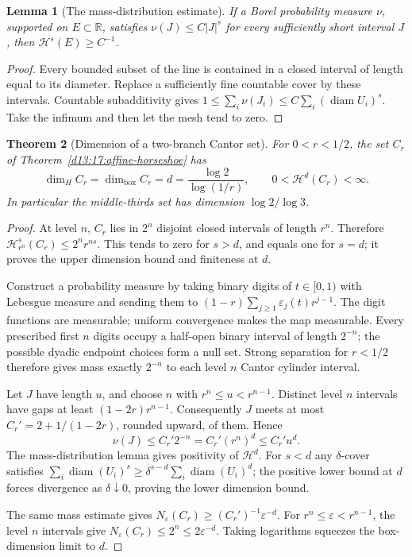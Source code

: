 \documentclass[11pt,oneside]{book}
\newtheorem{theorem}{Theorem}[chapter]
\newtheorem{lemma}[theorem]{Lemma}
\theoremstyle{definition}
\theoremstyle{remark}\newtheorem{remark}[theorem]{Remark}
\newcommand{\R}{\mathbb R}\newcommand{\C}{\mathbb C}
\newcommand{\abs}[1]{\lvert#1\rvert}\newcommand{\norm}[1]{\lVert#1\rVert}
\begin{document}
\begin{lemma}[The mass-distribution estimate]\label{d13:18:mass-distribution}
If a Borel probability measure \(\nu\), supported on \(E\subset\R\),
satisfies \(\nu(J)\leq C\abs{J}^s\) for every sufficiently short
interval \(J\), then \(\mathcal H^s(E)\geq C^{-1}\).
\end{lemma}
\begin{proof}
Every bounded subset of the line is contained in a closed interval
of length equal to its diameter. Replace a sufficiently fine
countable cover by these intervals. Countable subadditivity gives
\(1\leq\sum_i\nu(J_i)\leq C\sum_i(\operatorname{diam}U_i)^s\).
Take the infimum and then let the mesh tend to zero.
\end{proof}

\begin{theorem}[Dimension of a two-branch Cantor set]\label{d13:18:cantor-dimension}
For \(0<r<1/2\), the set \(C_r\) of
Theorem~\ref{d13:17:affine-horseshoe} has
\[
 \dim_H C_r=\dim_{\mathrm{box}}C_r
       =d=\frac{\log2}{\log(1/r)},\qquad
          0<\mathcal H^d(C_r)<\infty .
\]
In particular the middle-thirds set has dimension \(\log2/\log3\).
\end{theorem}
\begin{proof}
At level \(n\), \(C_r\) lies in \(2^n\) disjoint closed intervals
of length \(r^n\). Therefore
\(\mathcal H^s_{r^n}(C_r)\leq 2^nr^{ns}\).
This tends to zero for \(s>d\), and equals one for \(s=d\);
it proves the upper dimension bound and finiteness at \(d\).

Construct a probability measure by taking binary digits of
\(t\in[0,1)\) with Lebesgue measure and sending them to
\((1-r)\sum_{j\geq1}\varepsilon_j(t)r^{j-1}\).
The digit functions are measurable; uniform convergence makes the
map measurable. Every prescribed first \(n\) digits occupy a
half-open binary interval of length \(2^{-n}\); the possible
dyadic endpoint choices form a null set. Strong separation for
\(r<1/2\) therefore gives mass exactly \(2^{-n}\) to each level
\(n\) Cantor cylinder interval.

Let \(J\) have length \(u\), and choose \(n\) with
\(r^n\leq u<r^{n-1}\). Distinct level \(n\) intervals have gaps
at least \((1-2r)r^{n-1}\). Consequently \(J\) meets at most
\(C_r'=2+1/(1-2r)\), rounded upward, of them. Hence
\[
 \nu(J)\leq C_r'2^{-n}=C_r'(r^n)^d\leq C_r'u^d .
\]
The mass-distribution lemma gives positivity of \(\mathcal H^d\).
For \(s<d\) any \(\delta\)-cover satisfies
\(\sum_i\operatorname{diam}(U_i)^s
\geq \delta^{s-d}\sum_i\operatorname{diam}(U_i)^d\);
the positive lower bound at \(d\) forces divergence as
\(\delta\downarrow0\), proving the lower dimension bound.

The same mass estimate gives
\(N_\varepsilon(C_r)\geq (C_r')^{-1}\varepsilon^{-d}\).
For \(r^n\leq\varepsilon<r^{n-1}\), the level \(n\) intervals
give \(N_\varepsilon(C_r)\leq2^n\leq2\varepsilon^{-d}\).
Taking logarithms squeezes the box-dimension limit to \(d\).
\end{proof}
\end{document}
